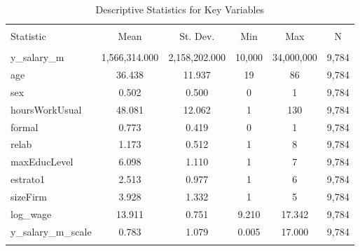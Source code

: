 
\begin{table}[!htbp] \centering 
  \caption{Descriptive Statistics for Key Variables} 
  \label{} 
\begin{tabular}{@{\extracolsep{5pt}}lccccc} 
\\[-1.8ex]\hline 
\hline \\[-1.8ex] 
Statistic & \multicolumn{1}{c}{Mean} & \multicolumn{1}{c}{St. Dev.} & \multicolumn{1}{c}{Min} & \multicolumn{1}{c}{Max} & \multicolumn{1}{c}{N} \\ 
\hline \\[-1.8ex] 
y\_salary\_m & 1,566,314.000 & 2,158,202.000 & 10,000 & 34,000,000 & 9,784 \\ 
age & 36.438 & 11.937 & 19 & 86 & 9,784 \\ 
sex & 0.502 & 0.500 & 0 & 1 & 9,784 \\ 
hoursWorkUsual & 48.081 & 12.062 & 1 & 130 & 9,784 \\ 
formal & 0.773 & 0.419 & 0 & 1 & 9,784 \\ 
relab & 1.173 & 0.512 & 1 & 8 & 9,784 \\ 
maxEducLevel & 6.098 & 1.110 & 1 & 7 & 9,784 \\ 
estrato1 & 2.513 & 0.977 & 1 & 6 & 9,784 \\ 
sizeFirm & 3.928 & 1.332 & 1 & 5 & 9,784 \\ 
log\_wage & 13.911 & 0.751 & 9.210 & 17.342 & 9,784 \\ 
y\_salary\_m\_scale & 0.783 & 1.079 & 0.005 & 17.000 & 9,784 \\ 
\hline \\[-1.8ex] 
\end{tabular} 
\end{table} 
